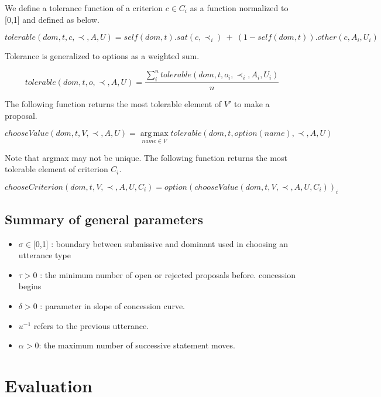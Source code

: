 \documentclass{llncs}
\begin{document}
	We define a tolerance function of a criterion $c \in C_i$ as a function normalized to [0,1] and defined as below.
	
	$$tolerable(dom, t, c, \prec, A, U) = self(dom, t) . sat(c, \prec_i) \ +\  (1 - self(dom, t)) . other(c, A_i, U_i)$$
	
	Tolerance is generalized to options as a weighted sum.
	
	$$tolerable(dom, t, o, \prec, A, U) = \frac{ \sum_{i}^{n} tolerable(dom, t, o_i, \prec_i, A_i, U_i) } {n}$$ 
	
	
	
	The following function returns the most tolerable element of $V'$ to make a proposal.
	
	$$ chooseValue(dom, t, V, \prec, A, U) =	\operatorname*{arg\,max}_{name \in V} tolerable(dom, t, option(name), \prec, A, U) $$
	
	Note that argmax may not be unique.  The following function returns the most tolerable element of	criterion $C_i$.
	
	$$chooseCriterion(dom, t, V, \prec, A, U, C_i) = option(chooseValue(dom, t, V, \prec, A, U, C_i))_i$$
	
	
	
	
	\subsection{Summary of general parameters }
	\begin{itemize}
		
		\item $\sigma \in $[0,1] : boundary between submissive and dominant used in
		choosing an utterance type
		\item $\tau > 0$ : the minimum number of open or rejected proposals before.
		concession begins
		\item $\delta > 0$ : parameter in slope of concession curve.
		\item $u^{-1}$ refers to the previous utterance.
		\item $\alpha> 0$: the maximum number of successive statement moves.
		
		
	\end{itemize}
	

			  
	\section{Evaluation}
	
\end{document}
